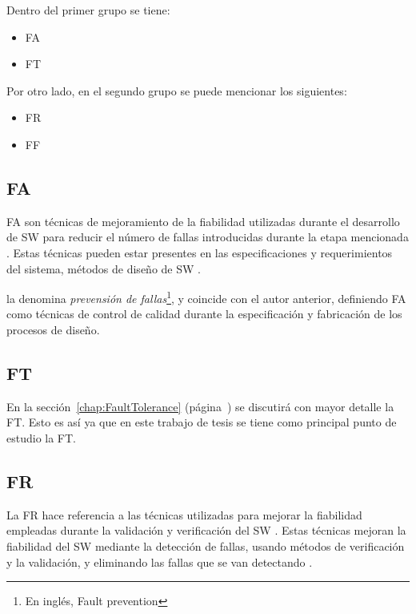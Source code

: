 Dentro del primer grupo se tiene:
\begin{itemize}
 \item \acl{FA}
 \item \acl{FT}
\end{itemize}

Por otro lado, en el segundo grupo se puede mencionar los siguientes:
\begin{itemize}
 \item \acl{FR}
 \item \acl{FF}
\end{itemize}

\subsection{\acl{FA}}
\ac{FA} son técnicas de mejoramiento de la fiabilidad utilizadas durante el desarrollo de \ac{SW} 
para reducir el número de fallas introducidas durante la etapa mencionada \citep{Pullum01}. Estas 
técnicas pueden estar presentes en las especificaciones y requerimientos del sistema, métodos de 
diseño de \ac{SW} \citep{Pullum01}.

\cite{FTDesign} la denomina \textit{prevensión de fallas}\footnote{En inglés, Fault prevention}, y 
coincide con el autor anterior, definiendo \ac{FA} como técnicas de control de calidad durante la 
especificación y fabricación de los procesos de diseño. 


\subsection{\acl{FT}}
En la sección~\ref{chap:FaultTolerance} (página~\pageref{chap:FaultTolerance}) se discutirá con 
mayor detalle la \ac{FT}. Esto es así ya que en este trabajo de tesis se tiene como principal punto 
de estudio la \acl{FT}.

\subsection{\acl{FR}}
La \ac{FR} hace referencia a las técnicas utilizadas para mejorar la fiabilidad empleadas durante 
la validación y verificación del \ac{SW} \citep{Pullum01}. Estas técnicas mejoran la fiabilidad del 
\ac{SW} mediante la detección de fallas, usando métodos de verificación y la validación, y 
eliminando las fallas que se van detectando \citep{Pullum01}. 

